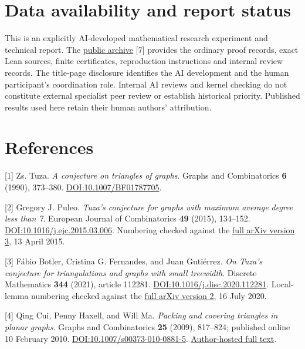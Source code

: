 \documentclass[11pt]{article}
\begin{document}
\section{Data availability and report
status}\label{data-availability-and-report-status}

This is an explicitly AI-developed mathematical research experiment and
technical report. The \href{https://github.com/pappa211/ai-math-experiments/blob/main/problems/TUZA-06/README.md}{public
archive} {[}7{]} provides the ordinary proof records, exact Lean
sources, finite certificates, reproduction instructions and internal
review records. The title-page disclosure identifies the AI development
and the human participant's coordination role. Internal AI reviews and
kernel checking do not constitute external specialist peer review or
establish historical priority. Published results used here retain their
human authors' attribution.

\section{References}\label{references}

{[}1{]} Zs. Tuza. \emph{A conjecture on triangles of graphs}. Graphs and
Combinatorics \textbf{6} (1990), 373--380.
\href{https://doi.org/10.1007/BF01787705}{DOI:10.1007/BF01787705}.

{[}2{]} Gregory J. Puleo. \emph{Tuza's conjecture for graphs with
maximum average degree less than 7}. European Journal of Combinatorics
\textbf{49} (2015), 134--152.
\href{https://doi.org/10.1016/j.ejc.2015.03.006}{DOI:10.1016/j.ejc.2015.03.006}.
Numbering checked against the
\href{https://arxiv.org/pdf/1308.2211v3}{full arXiv version 3}, 13 April
2015.

{[}3{]} Fábio Botler, Cristina G. Fernandes, and Juan Gutiérrez.
\emph{On Tuza's conjecture for triangulations and graphs with small
treewidth}. Discrete Mathematics \textbf{344} (2021), article 112281.
\href{https://doi.org/10.1016/j.disc.2020.112281}{DOI:10.1016/j.disc.2020.112281}.
Local-lemma numbering checked against the
\href{https://arxiv.org/pdf/2002.07925v2}{full arXiv version 2}, 16 July
2020.

{[}4{]} Qing Cui, Penny Haxell, and Will Ma. \emph{Packing and covering
triangles in planar graphs}. Graphs and Combinatorics \textbf{25}
(2009), 817--824; published online 10 February 2010.
\href{https://doi.org/10.1007/s00373-010-0881-5}{DOI:10.1007/s00373-010-0881-5}.
\href{https://www.columbia.edu/~wm2428/papers/packing_covering_triangles.pdf}{Author-hosted
full text}.
\end{document}
